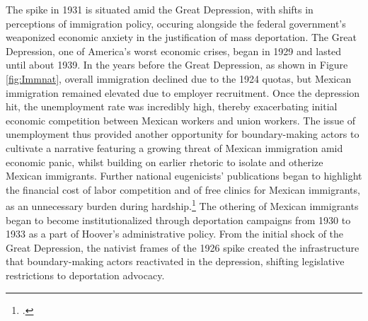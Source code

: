 \documentclass[12pt,a4paper]{article}
\begin{document}
The spike in 1931 is situated amid the Great Depression, with shifts in perceptions of immigration policy, occuring alongside the federal government's weaponized economic anxiety in the justification of mass deportation. The Great Depression, one of America's worst economic crises, began in 1929 and lasted until about 1939. In the years before the Great Depression, as shown in Figure \ref{fig:Immnat}, overall immigration declined due to the 1924 quotas, but Mexican immigration remained elevated due to employer recruitment. Once the depression hit, the unemployment rate was incredibly high, thereby exacerbating initial economic competition between Mexican workers and union workers. The issue of unemployment thus provided another opportunity for boundary-making actors to cultivate a narrative featuring a growing threat of Mexican immigration amid economic panic, whilst building on earlier rhetoric to isolate and otherize Mexican immigrants. Further national eugenicists' publications began to highlight the financial cost of labor competition and of free clinics for Mexican immigrants, as an unnecessary burden during hardship.\footcite{hubbard_national_2011} The othering of Mexican immigrants began to become institutionalized through deportation campaigns from 1930 to 1933 as a part of Hoover's administrative policy. From the initial shock of the Great Depression, the nativist frames of the 1926 spike created the infrastructure that boundary-making actors reactivated in the depression, shifting legislative restrictions to deportation advocacy.
\end{document}
